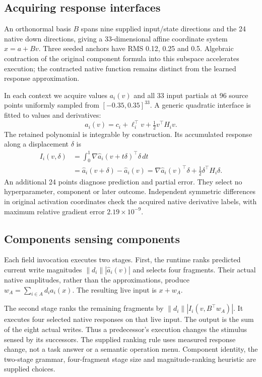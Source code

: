 \documentclass[11pt]{article}
\begin{document}
\subsection{Acquiring response interfaces}
An orthonormal basis $B$ spans nine supplied input/state directions and the 24 native down directions, giving a 33-dimensional affine coordinate system $x=a+Bv$. Three seeded anchors have RMS 0.12, 0.25 and 0.5. Algebraic contraction of the original component formula into this subspace accelerates execution; the contracted native function remains distinct from the learned response approximation.

In each context we acquire values $a_i(v)$ and all 33 input partials at 96 source points uniformly sampled from $[-0.35,0.35]^{33}$. A generic quadratic interface is fitted to values and derivatives:
\begin{equation}
 \widehat a_i(v)=c_i+\ell_i^\top v+\tfrac12v^\top H_i v.
\end{equation}
The retained polynomial is integrable by construction. Its accumulated response along a displacement $\delta$ is
\begin{align}
 I_i(v,\delta)&=\int_0^1\nabla\widehat a_i(v+t\delta)^\top\delta\,dt\\
 &=\widehat a_i(v+\delta)-\widehat a_i(v)
 =\nabla\widehat a_i(v)^\top\delta+\tfrac12\delta^\top H_i\delta.
\end{align}
An additional 24 points diagnose prediction and partial error. They select no hyperparameter, component or later outcome. Independent symmetric differences in original activation coordinates check the acquired native derivative labels, with maximum relative gradient error $2.19\times10^{-9}$.

\subsection{Components sensing components}
Each field invocation executes two stages. First, the runtime ranks predicted current write magnitudes $\|d_i\||\widehat a_i(v)|$ and selects four fragments. Their actual native amplitudes, rather than the approximations, produce $w_A=\sum_{i\in A}d_i a_i(x)$. The resulting live input is $x+w_A$.

The second stage ranks the remaining fragments by $\|d_i\||I_i(v,B^\top w_A)|$. It executes four selected native responses on that live input. The output is the sum of the eight actual writes. Thus a predecessor's execution changes the stimulus sensed by its successors. The supplied ranking rule uses measured response change, not a task answer or a semantic operation menu. Component identity, the two-stage grammar, four-fragment stage size and magnitude-ranking heuristic are supplied choices.
\end{document}
